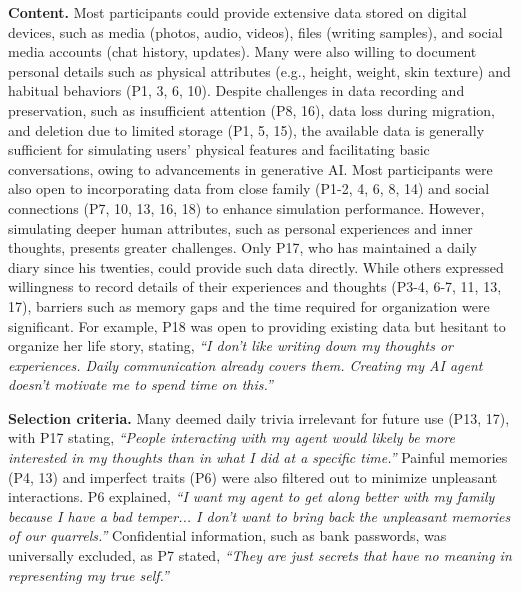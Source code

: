 \textbf{Content.} \label{content}
Most participants could provide extensive data stored on digital devices, such as media (photos, audio, videos), files (writing samples), and social media accounts (chat history, updates). Many were also willing to document personal details such as physical attributes (e.g., height, weight, skin texture) and habitual behaviors (P1, 3, 6, 10). Despite challenges in data recording and preservation, such as insufficient attention (P8, 16), data loss during migration, and deletion due to limited storage (P1, 5, 15), the available data is generally sufficient for simulating users' physical features and facilitating basic conversations, owing to advancements in generative AI. Most participants were also open to incorporating data from close family (P1-2, 4, 6, 8, 14) and social connections (P7, 10, 13, 16, 18) to enhance simulation performance.
However, simulating deeper human attributes, such as personal experiences and inner thoughts, presents greater challenges. Only P17, who has maintained a daily diary since his twenties, could provide such data directly. While others expressed willingness to record details of their experiences and thoughts (P3-4, 6-7, 11, 13, 17), barriers such as memory gaps and the time required for organization were significant. 
For example, P18 was open to providing existing data but hesitant to organize her life story, stating, \textit{``I don't like writing down my thoughts or experiences. Daily communication already covers them. Creating my AI agent doesn't motivate me to spend time on this.''}

\textbf{Selection criteria. } \label{selection criteria}
 Many deemed daily trivia irrelevant for future use (P13, 17), with P17 stating, \textit{``People interacting with my agent would likely be more interested in my thoughts than in what I did at a specific time.''}  Painful memories (P4, 13) and imperfect traits (P6) were also filtered out to minimize unpleasant interactions. P6 explained, \textit{``I want my agent to get along better with my family because I have a bad temper... I don't want to bring back the unpleasant memories of our quarrels.''} Confidential information, such as bank passwords, was universally excluded, as P7 stated, \textit{``They are just secrets that have no meaning in representing my true self.''} 

